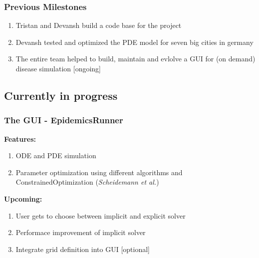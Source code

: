 \documentclass{beamer}
\begin{document}
\begin{frame}
\frametitle{Previous Milestones}
	\begin{enumerate}[$\bullet$]
		\item Tristan and Devansh build a code base for the project
		\item Devansh tested and optimized the PDE model for seven big cities in germany
		\item The entire team helped to build, maintain and evlolve a GUI for (on demand) disease simulation [ongoing]
	\end{enumerate}
\end{frame}


\subsection{Currently in progress}

\begin{frame}
\frametitle{The GUI - EpidemicsRunner} 
	\textbf{Features:}
	\begin{enumerate}[$\bullet$]
		\item ODE and PDE simulation
		\item Parameter optimization using different algorithms and ConstrainedOptimization (\textit{Scheidemann et al.})
	\end{enumerate}
	\textit{ }\newline
	\textbf{Upcoming:}
	\begin{enumerate}[$\bullet$]
		\item User gets to choose between implicit and explicit solver
		\item Performace improvement of implicit solver
		\item Integrate grid definition into GUI [optional]
	\end{enumerate}
\end{frame}
\end{document}
